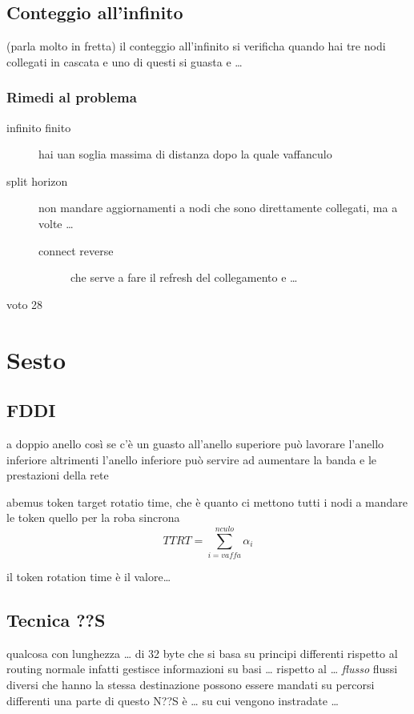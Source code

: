 \documentclass[11pt]{article}
\begin{document}
\subsection{Conteggio all'infinito}
\label{sec:orgb739c61}
(parla molto in fretta)
il conteggio all'infinito si verificha quando hai tre nodi collegati in cascata e uno di questi si guasta e \ldots{}

\subsubsection{Rimedi al problema}
\label{sec:org9821d74}
\begin{description}
\item[{infinito finito}] hai uan soglia massima di distanza dopo la quale vaffanculo
\item[{split horizon}] non mandare aggiornamenti a nodi che sono direttamente collegati, ma a volte \ldots{}
\begin{description}
\item[{connect reverse}] che serve a fare il refresh del collegamento e \ldots{}
\end{description}
\end{description}

voto 28
\section{Sesto}
\label{sec:orgdb93d95}
\subsection{FDDI}
\label{sec:org76998a9}
a doppio anello così se c'è un guasto all'anello superiore può lavorare l'anello inferiore
altrimenti l'anello inferiore può servire ad aumentare la banda e le prestazioni della rete

abemus token target rotatio time, che è quanto ci mettono tutti i nodi a mandare le token
quello per la roba sincrona
\[ TTRT = \sum_{i = vaffa}^{nculo} \alpha _i \]

il token rotation time è il valore\ldots{}

\subsection{Tecnica ??S}
\label{sec:orgc8c9a43}
qualcosa con lunghezza \ldots{} di 32 byte che si basa su principi differenti rispetto al routing normale infatti gestisce informazioni su basi \ldots{} rispetto al \ldots{}
\emph{flusso}
flussi diversi che hanno la stessa destinazione possono essere mandati su percorsi differenti
una parte di questo N??S è \ldots{} su cui vengono instradate \ldots{}
\end{document}
